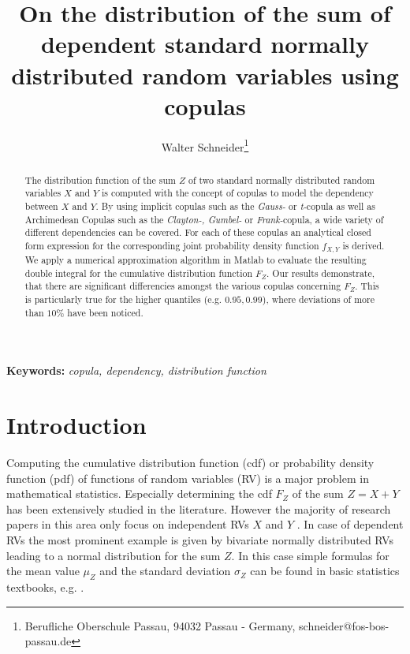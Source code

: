 \documentclass[a4paper]{article}
\begin{document}
	\title{\bf On the distribution of the sum of dependent standard normally distributed random variables using copulas}
	\author{Walter Schneider\thanks{Berufliche Oberschule Passau, 94032 Passau - Germany, schneider@fos-bos-passau.de}}
	\maketitle
	\pagestyle{headings}

	
\begin{abstract}
	The distribution function of the sum $Z$ of two standard normally distributed random variables $X$ and $Y$ is computed with the concept of copulas to model the dependency between $X$ and $Y$. By using implicit copulas such as the {\it Gauss-} or {\it t-}copula as well as Archimedean Copulas such as the {\it Clayton-, Gumbel-} or {\it Frank-}copula, a wide variety of different dependencies can be covered.
	For each of these copulas an analytical closed form expression for the corresponding joint probability density function $f_{X,Y}$ is derived. We apply a numerical approximation algorithm in Matlab to evaluate the resulting double integral for the cumulative distribution function $F_Z$. Our results demonstrate, that there are significant differencies amongst the various copulas concerning $F_Z$. This is particularly true for the higher quantiles (e.g. $0.95, 0.99$), where deviations of more than $10\%$ have been noticed.
\end{abstract}
	
\vspace{0.4cm}
	{\bf Keywords: } {\it copula, dependency, distribution function}





\section{Introduction}
Computing the cumulative distribution function (cdf) or probability density function (pdf) of functions of random variables (RV) is a major problem in mathematical statistics. Especially determining the cdf $F_Z$ of the sum $Z = X+Y$ has been extensively studied in the literature.  However the majority of research papers in this area only focus on independent RVs $X$ and $Y$ \cite{AE01, AMH09, DA14}. In case of dependent RVs the most prominent example is given by bivariate normally distributed RVs leading to a normal distribution for the sum $Z$. In this case simple formulas for the mean value $\mu_Z$ and the standard deviation $\sigma_Z$ can be found in basic statistics textbooks, e.g. \cite{PP02}.
\end{document}
